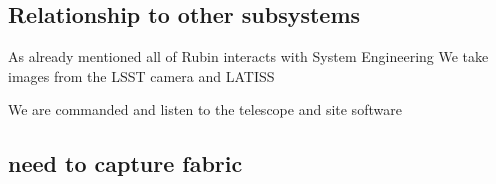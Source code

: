 \subsection{Relationship to other subsystems}

As already mentioned all of Rubin interacts with System Engineering
   We take images from the  LSST camera \citep{2010SPIE.7735E..0JK} and LATISS \citep{2020SPIE11452E..0UI}

   We are commanded and listen to the telescope  and site software  \citep{2022SPIE12182E..0WT}


\subsection{need to capture fabric }
